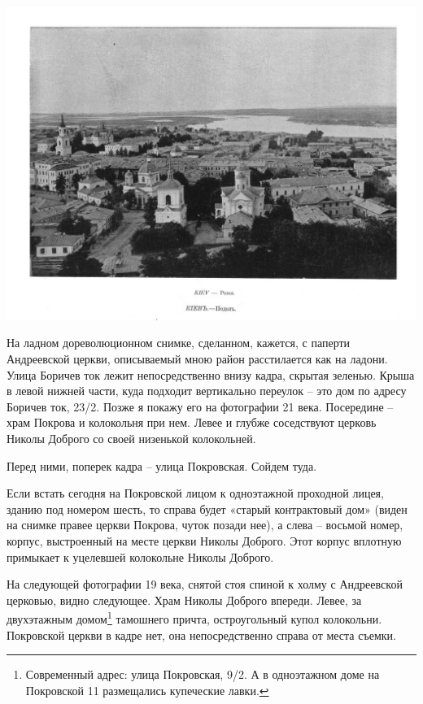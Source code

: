 \begin{center}
\includegraphics[width=\linewidth]{chast-colebanie-osnov/borichev-tok/podol-panorama.jpg}
\end{center}

На ладном дореволюционном снимке, сделанном, кажется, с паперти Андреевской церкви, описываемый мною район расстилается как на ладони. Улица Боричев ток лежит непосредственно внизу кадра, скрытая зеленью. Крыша в левой нижней части, куда подходит вертикально переулок – это дом по адресу Боричев ток, 23/2. Позже я покажу его на фотографии 21 века. Посередине – храм Покрова и колокольня при нем. Левее и глубже соседствуют церковь Николы Доброго со своей низенькой колокольней.

Перед ними, поперек кадра – улица Покровская. Сойдем туда.

Если встать сегодня на Покровской лицом к одноэтажной проходной лицея, зданию под номером шесть, то справа будет «старый контрактовый дом» (виден на снимке правее церкви Покрова, чуток позади нее), а слева – восьмой номер, корпус, выстроенный на месте церкви Николы Доброго. Этот корпус вплотную примыкает к уцелевшей колокольне Николы Доброго. 

На следующей фотографии 19 века, снятой стоя спиной к холму с Андреевской церковью, видно следующее. Храм Николы Доброго впереди. Левее, за двухэтажным домом\footnote{Современный адрес: улица Покровская, 9/2. А в одноэтажном доме на Покровской 11 размещались купеческие лавки.} тамошнего причта, остроугольный купол колокольни. Покровской церкви в кадре нет, она непосредственно справа от места съемки.

